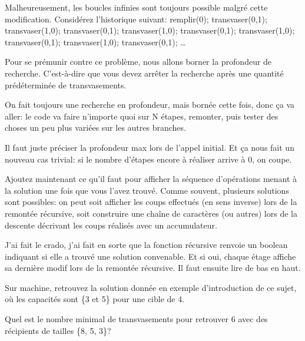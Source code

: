 \documentclass[10pt]{article}\usepackage[nu]{esial}%
\begin{document}
\Question Malheureusement, les boucles infinies sont toujours possible malgré
cette modification. Considérez l'historique suivant: remplir(0);
transvaser(0,1); transvaser(1,0); transvaser(0,1); transvaser(1,0);
transvaser(0,1); transvaser(1,0); transvaser(0,1); transvaser(1,0);
transvaser(0,1); \ldots

Pour se prémunir contre ce problème, nous allons borner la profondeur de
recherche. C'est-à-dire que vous devez arrêter la recherche après une quantité
prédéterminée de transvasements.

\begin{Reponse}
  On fait toujours une recherche en profondeur, mais bornée cette fois, donc ça
  va aller: le code va faire n'importe quoi sur N étapes, remonter, puis tester
  des choses un peu plus variées sur les autres branches.

  Il faut juste préciser la profondeur max lors de l'appel initial.
  Et ça nous fait un nouveau cas trivial: si le nombre d'étapes encore à
  réaliser arrive à 0, on coupe.
\end{Reponse}

\Question Ajoutez maintenant ce qu'il faut pour afficher la séquence
d'opérations menant à la solution une fois que vous l'avez trouvé. Comme
souvent, plusieurs solutions sont possibles: on peut soit afficher les coups
effectués (en sens inverse) lors de la remontée récursive, soit construire une
chaîne de caractères (ou autres) lors de la descente décrivant les coups
réalisés avec un accumulateur.

\begin{Reponse}
  J'ai fait le crado, j'ai fait en sorte que la fonction récursive renvoie un
  boolean indiquant si elle a trouvé une solution convenable. Et si oui, chaque
  étage affiche sa dernière modif lors de la remontée récursive. Il faut ensuite
  lire de bas en haut.

  \newcommand*\FancyVerbStartString{// BEGIN SOLVE}
  \newcommand*\FancyVerbStopString{// END SOLVE}
\end{Reponse}

\Question Sur machine, retrouvez la solution donnée en exemple d'introduction de
ce sujet, où les capacités sont \{3 et 5\} pour une cible de 4.

\Question Quel est le nombre minimal de transvasements pour retrouver 6 avec des
récipients de tailles \{8, 5, 3\}?
\end{document}
